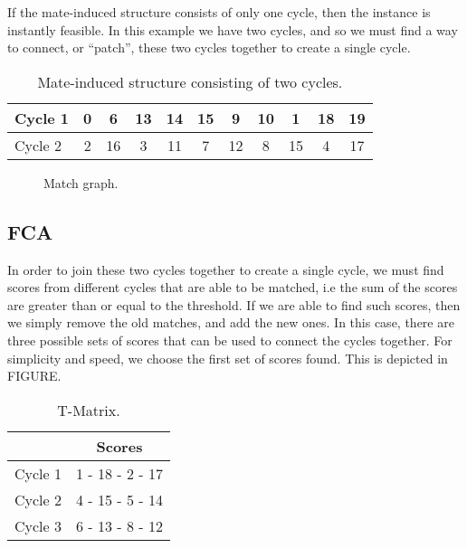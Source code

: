 \documentclass[a4paper, 11pt, twoside, onecolumn, openany]{article}
\begin{document}
If the mate-induced structure consists of only one cycle, then the instance is instantly feasible. In this example we have two cycles, and so we must find a way to connect, or ``patch'', these two cycles together to create a single cycle.


\begin{table}[!htb]
	\centering
	\begin{tabular}{|l*{10}{|c}|}
		\hline
		Cycle 1 & 0 & 6 & 13 & 14 & 15 & 9 & 10 & 1 & 18 & 19 \\ \hline
		Cycle 2 & 2 & 16 & 3 & 11 & 7 & 12 & 8 & 15 & 4 & 17 \\
		\hline
	\end{tabular}
	\caption{Mate-induced structure consisting of two cycles.}	
	\label{table:mis}
\end{table}

\begin{figure}[!htb]
	\centering
	
	\caption{Match graph.}
	\label{fig:mis}	
\end{figure}



\subsection{FCA}%
In order to join these two cycles together to create a single cycle, we must find scores from different cycles that are able to be matched, i.e the sum of the scores are greater than or equal to the threshold. If we are able to find such scores, then we simply remove the old matches, and add the new ones. In this case, there are three possible sets of scores that can be used to connect the cycles together. For simplicity and speed, we choose the first set of scores found. This is depicted in FIGURE.
 

\begin{table}[!htb]
	\centering
	\begin{tabular}{c|c|}
		\cline{2-2}
		& Scores \\ \hline
		\multicolumn{1}{|c|}{Cycle 1} & 1 - 18 - 2 - 17 \\ \hline
		\multicolumn{1}{|c|}{Cycle 2} & 4 - 15 - 5 - 14 \\ \hline
		\multicolumn{1}{|c|}{Cycle 3} & 6 - 13 - 8 - 12 \\
		\hline
	\end{tabular}
	\caption{T-Matrix.}
	\label{table:tcycles}
\end{table}	
\end{document}
